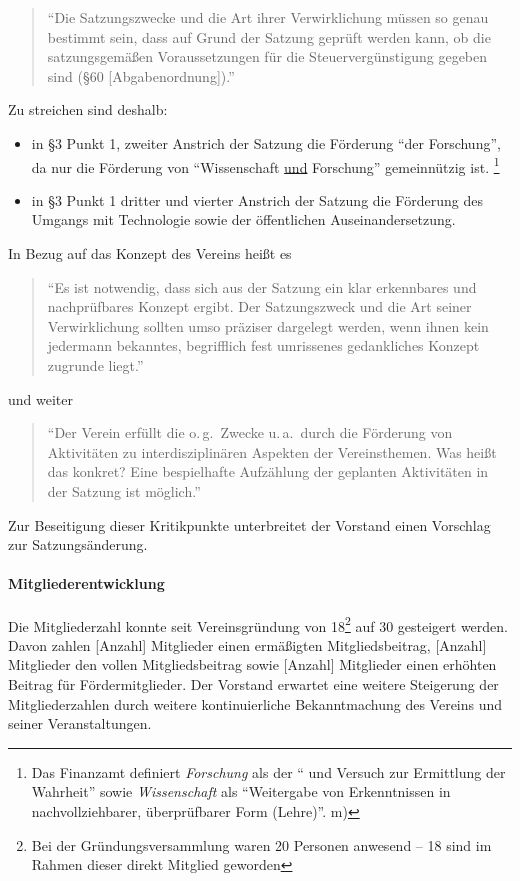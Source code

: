 \documentclass[10pt,DIV16]{scrartcl}
\begin{document}
\begin{quote}
	"`Die Satzungszwecke und die Art ihrer Verwirklichung müssen so genau
	bestimmt sein, dass auf Grund der Satzung geprüft werden kann, ob die
	satzungsgemäßen Voraussetzungen für die Steuervergünstigung gegeben sind
	(§60 [Abgabenordnung])."'
\end{quote}
Zu streichen sind deshalb:
\begin{itemize}
	\item
		in §3 Punkt 1, zweiter Anstrich der Satzung die Förderung "`der
		Forschung"', da nur die Förderung von "`Wissenschaft \underline{und}
		Forschung"' gemeinnützig ist.
		\footnote{
			Das Finanzamt definiert \emph{Forschung} als der
			"`\underline{} und
			\underline{} Versuch zur Ermittlung der
			Wahrheit"' sowie \emph{Wissenschaft} als "`Weitergabe von
			Erkenntnissen in nachvollziehbarer, überprüfbarer Form (Lehre)"'.
			\quad m)
		}
	\item
		in §3 Punkt 1 dritter und vierter Anstrich der Satzung die Förderung
		des Umgangs mit Technologie sowie der öffentlichen Auseinandersetzung.
\end{itemize}
In Bezug auf das Konzept des Vereins heißt es
\begin{quote}
	"`Es ist notwendig, dass sich aus der Satzung ein klar erkennbares und
	nachprüfbares Konzept ergibt.  Der Satzungszweck und die Art seiner
	Verwirklichung sollten umso präziser dargelegt werden, wenn ihnen kein
	jedermann bekanntes, begrifflich fest umrissenes gedankliches Konzept
	zugrunde liegt."'
\end{quote}
und weiter
\begin{quote}
	"`Der Verein erfüllt die o.\,g.\ Zwecke u.\,a.\ durch \glq die Förderung von
	Aktivitäten zu interdisziplinären Aspekten der Vereinsthemen\grq.  Was heißt
	das konkret?  Eine bespielhafte Aufzählung der geplanten Aktivitäten in
	der Satzung ist möglich."'
\end{quote}
Zur Beseitigung dieser Kritikpunkte unterbreitet der Vorstand einen Vorschlag
zur Satzungsänderung.

\paragraph{Mitgliederentwicklung}

Die Mitgliederzahl konnte seit Vereinsgründung von 18\footnote{Bei 
der Gründungsversammlung waren 20 Personen anwesend -- 18 sind im 
Rahmen dieser direkt Mitglied geworden} auf 30 gesteigert werden. 
Davon zahlen [Anzahl] Mitglieder einen ermäßigten Mitgliedsbeitrag, 
[Anzahl] Mitglieder den vollen Mitgliedsbeitrag sowie [Anzahl] 
Mitglieder einen erhöhten Beitrag für Fördermitglieder.  Der 
Vorstand erwartet eine weitere Steigerung der Mitgliederzahlen durch 
weitere kontinuierliche Bekanntmachung des Vereins und seiner 
Veranstaltungen.
\end{document}
